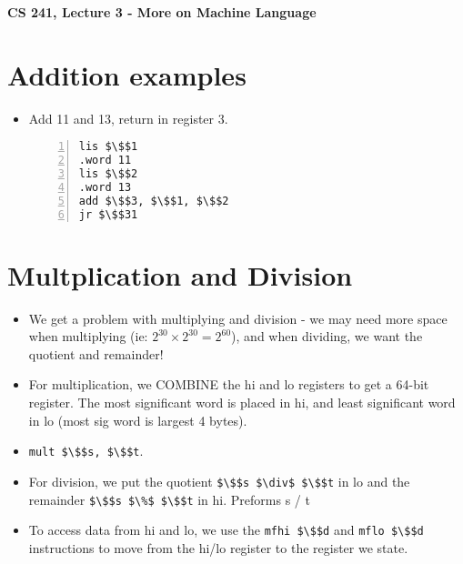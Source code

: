 \documentclass[12pt]{article}
\author{Clement Tsang}
\begin{document}
\begin{center}
\Large\textbf{CS 241, Lecture 3 - More on Machine Language}
\end{center}

\section{Addition examples}
\begin{itemize}
    \item Add 11 and 13, return in register 3.
        \begin{lstlisting}[mathescape, numbers=left, breaklines=true]
lis $\$$1
.word 11
lis $\$$2
.word 13
add $\$$3, $\$$1, $\$$2
jr $\$$31
        \end{lstlisting}
\end{itemize}

\section{Multplication and Division}
\begin{itemize}
    \item We get a problem with multiplying and division - we may need more space when multiplying (ie: $2^{30} \times 2^{30} = 2^{60}$), and when dividing, we want the quotient and remainder!
    \item For multiplication, we COMBINE the hi and lo registers to get a 64-bit register.  The most significant word is placed in hi, and least significant word in lo (most sig word is largest 4 bytes).
    \item \lstinline[mathescape]{mult $\$$s, $\$$t}.
    \item For division, we put the quotient \lstinline[mathescape]{$\$$s $\div$ $\$$t} in lo and the remainder \lstinline[mathescape]{$\$$s $\%$ $\$$t} in hi.  Preforms s / t
    \item To access data from hi and lo, we use the \lstinline[mathescape]{mfhi $\$$d} and \lstinline[mathescape]{mflo $\$$d} instructions to move from the hi/lo register to the register we state.
\end{itemize}
\end{document}
